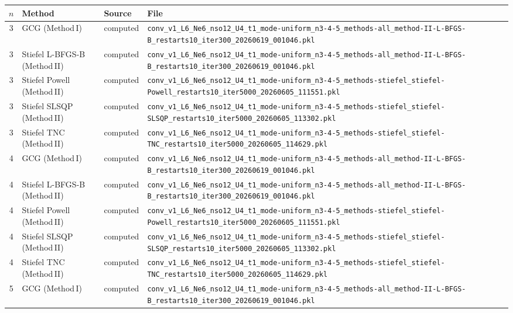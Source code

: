 \begin{tabular}{c l l l}
\toprule
$n$ & Method & Source & File \\
\midrule
3 & GCG (Method\,I) & computed & {\scriptsize\texttt{conv\_v1\_L6\_Ne6\_nso12\_U4\_t1\_mode-uniform\_n3-4-5\_methods-all\_method-II-L-BFGS-B\_restarts10\_iter300\_20260619\_001046.pkl}} \\
3 & Stiefel L-BFGS-B (Method\,II) & computed & {\scriptsize\texttt{conv\_v1\_L6\_Ne6\_nso12\_U4\_t1\_mode-uniform\_n3-4-5\_methods-all\_method-II-L-BFGS-B\_restarts10\_iter300\_20260619\_001046.pkl}} \\
3 & Stiefel Powell (Method\,II) & computed & {\scriptsize\texttt{conv\_v1\_L6\_Ne6\_nso12\_U4\_t1\_mode-uniform\_n3-4-5\_methods-stiefel\_stiefel-Powell\_restarts10\_iter5000\_20260605\_111551.pkl}} \\
3 & Stiefel SLSQP (Method\,II) & computed & {\scriptsize\texttt{conv\_v1\_L6\_Ne6\_nso12\_U4\_t1\_mode-uniform\_n3-4-5\_methods-stiefel\_stiefel-SLSQP\_restarts10\_iter5000\_20260605\_113302.pkl}} \\
3 & Stiefel TNC (Method\,II) & computed & {\scriptsize\texttt{conv\_v1\_L6\_Ne6\_nso12\_U4\_t1\_mode-uniform\_n3-4-5\_methods-stiefel\_stiefel-TNC\_restarts10\_iter5000\_20260605\_114629.pkl}} \\
4 & GCG (Method\,I) & computed & {\scriptsize\texttt{conv\_v1\_L6\_Ne6\_nso12\_U4\_t1\_mode-uniform\_n3-4-5\_methods-all\_method-II-L-BFGS-B\_restarts10\_iter300\_20260619\_001046.pkl}} \\
4 & Stiefel L-BFGS-B (Method\,II) & computed & {\scriptsize\texttt{conv\_v1\_L6\_Ne6\_nso12\_U4\_t1\_mode-uniform\_n3-4-5\_methods-all\_method-II-L-BFGS-B\_restarts10\_iter300\_20260619\_001046.pkl}} \\
4 & Stiefel Powell (Method\,II) & computed & {\scriptsize\texttt{conv\_v1\_L6\_Ne6\_nso12\_U4\_t1\_mode-uniform\_n3-4-5\_methods-stiefel\_stiefel-Powell\_restarts10\_iter5000\_20260605\_111551.pkl}} \\
4 & Stiefel SLSQP (Method\,II) & computed & {\scriptsize\texttt{conv\_v1\_L6\_Ne6\_nso12\_U4\_t1\_mode-uniform\_n3-4-5\_methods-stiefel\_stiefel-SLSQP\_restarts10\_iter5000\_20260605\_113302.pkl}} \\
4 & Stiefel TNC (Method\,II) & computed & {\scriptsize\texttt{conv\_v1\_L6\_Ne6\_nso12\_U4\_t1\_mode-uniform\_n3-4-5\_methods-stiefel\_stiefel-TNC\_restarts10\_iter5000\_20260605\_114629.pkl}} \\
5 & GCG (Method\,I) & computed & {\scriptsize\texttt{conv\_v1\_L6\_Ne6\_nso12\_U4\_t1\_mode-uniform\_n3-4-5\_methods-all\_method-II-L-BFGS-B\_restarts10\_iter300\_20260619\_001046.pkl}} \\

\end{tabular}
